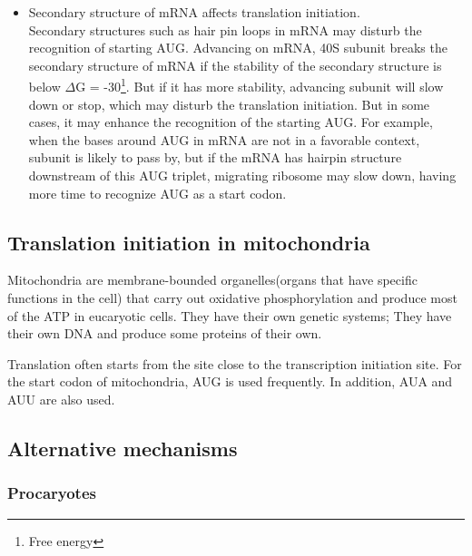 \begin{itemize}
\item Secondary structure of mRNA affects translation initiation.\\
Secondary structures such as hair pin loops in mRNA may disturb the 
recognition of starting AUG\cite{label21}. Advancing on mRNA, 
40S subunit breaks the secondary structure of mRNA if the stability
of the secondary structure is below \(\Delta\)G = -30\footnote{Free
energy}. But if it has 
more stability, advancing subunit will slow down or stop, which may
disturb the translation initiation.
But in some cases, it may enhance the recognition of the 
starting AUG\cite{label2}. For example, when the bases around AUG
in mRNA are not in a favorable context, subunit is likely to pass by, 
but if the mRNA has hairpin structure downstream of this AUG triplet,
migrating ribosome may slow down, having more time to recognize AUG
as a start codon.
\end{itemize}

\subsection{Translation initiation in mitochondria}
Mitochondria are membrane-bounded organelles(organs that have specific
functions in the cell) that carry out oxidative phosphorylation and
produce most of the ATP in eucaryotic cells. They have their own
genetic systems; They have their own DNA and produce some proteins
of their own. 

Translation often starts from the site close to the transcription 
initiation site. 
For the start codon of mitochondria, AUG is used frequently. In addition, AUA
and AUU are also used.  

\subsection{Alternative mechanisms}

\subsubsection{Procaryotes}

